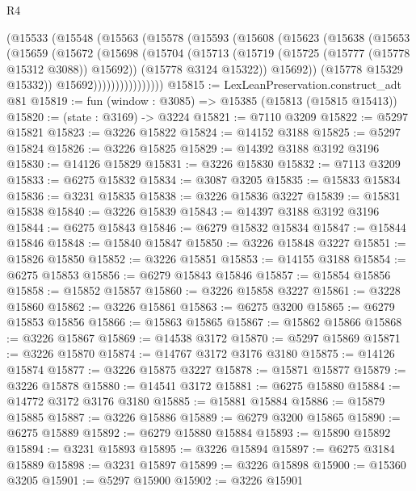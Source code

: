 \begin{lexlean}{R4}
\begin{coremodule}
                (@15533
                  (@15548
                    (@15563
                      (@15578
                        (@15593
                          (@15608
                            (@15623
                              (@15638
                                (@15653
                                  (@15659
                                    (@15672
                                      (@15698
                                        (@15704
                                          (@15713
                                            (@15719 (@15725 (@15777 (@15778 @15312 @3088)) @15692))
                                            (@15778 @3124 @15322))
                                          @15692))
                                      (@15778 @15329 @15332))
                                    @15692))))))))))))))))
@15815 := LexLeanPreservation.construct_adt @81
@15819 := fun (window : @3085) => @15385 (@15813 (@15815 @15413))
@15820 := (state : @3169) -> @3224
@15821 := @7110 @3209
@15822 := @5297 @15821
@15823 := @3226 @15822
@15824 := @14152 @3188
@15825 := @5297 @15824
@15826 := @3226 @15825
@15829 := @14392 @3188 @3192 @3196
@15830 := @14126 @15829
@15831 := @3226 @15830
@15832 := @7113 @3209
@15833 := @6275 @15832
@15834 := @3087 @3205
@15835 := @15833 @15834
@15836 := @3231 @15835
@15838 := @3226 @15836 @3227
@15839 := @15831 @15838
@15840 := @3226 @15839
@15843 := @14397 @3188 @3192 @3196
@15844 := @6275 @15843
@15846 := @6279 @15832 @15834
@15847 := @15844 @15846
@15848 := @15840 @15847
@15850 := @3226 @15848 @3227
@15851 := @15826 @15850
@15852 := @3226 @15851
@15853 := @14155 @3188
@15854 := @6275 @15853
@15856 := @6279 @15843 @15846
@15857 := @15854 @15856
@15858 := @15852 @15857
@15860 := @3226 @15858 @3227
@15861 := @3228 @15860
@15862 := @3226 @15861
@15863 := @6275 @3200
@15865 := @6279 @15853 @15856
@15866 := @15863 @15865
@15867 := @15862 @15866
@15868 := @3226 @15867
@15869 := @14538 @3172
@15870 := @5297 @15869
@15871 := @3226 @15870
@15874 := @14767 @3172 @3176 @3180
@15875 := @14126 @15874
@15877 := @3226 @15875 @3227
@15878 := @15871 @15877
@15879 := @3226 @15878
@15880 := @14541 @3172
@15881 := @6275 @15880
@15884 := @14772 @3172 @3176 @3180
@15885 := @15881 @15884
@15886 := @15879 @15885
@15887 := @3226 @15886
@15889 := @6279 @3200 @15865
@15890 := @6275 @15889
@15892 := @6279 @15880 @15884
@15893 := @15890 @15892
@15894 := @3231 @15893
@15895 := @3226 @15894
@15897 := @6275 @3184 @15889
@15898 := @3231 @15897
@15899 := @3226 @15898
@15900 := @15360 @3205
@15901 := @5297 @15900
@15902 := @3226 @15901

\end{coremodule}
\end{lexlean}
